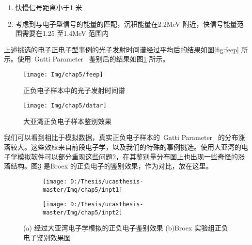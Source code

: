 \begin{enumerate}
\item 快慢信号距离小于1 米
\item 考虑到与电子型信号的能量的匹配，沉积能量在2.2MeV 附近，快信号能量范围需要在1.25 至1.4MeV 范围内
\end{enumerate}
上述挑选的电子正电子型事例的光子发射时间谱经过平均后的结果如图\ref{fig:feep} 所示。使用~Gatti Parameter~ 鉴别后的结果如图\ref{fig:datar} 所示。
\begin{figure}[!htbp]
\begin{minipage}[t]{0.48\linewidth}
    \centering
    \texttt{[image: Img/chap5/feep]}
    \caption{正负电子样本中的光子发射时间谱}
    \label{fig:feep}
\end{minipage}
\quad\quad
\begin{minipage}[t]{0.48\linewidth}
    \centering
    \texttt{[image: Img/chap5/datar]}
    \caption{大亚湾正负电子样本鉴别效果}
    \label{fig:datar}
\end{minipage}
\end{figure}
我们可以看到相比于模拟数据，真实正负电子样本的~Gatti Parameter~ 的分布涨落较大。这些效应来自前段电子学，以及我们的特殊的事例挑选。使用大亚湾的电子学模拟软件可以部分重现这些问题\ref{fig:inpt_1}，在其鉴别量分布图上也出现一些奇怪的涨落结构。图\ref{fig:inpt_2} 是Broex 的正负电子的鉴别效果，作为对比，放在这里。
\begin{figure}[!htbp]
  \centering
  \begin{subfigure}[b]{\MySubFactor\textwidth}
    \texttt{[image: D:/Thesis/ucasthesis-master/Img/chap5/inpt1]}
    \caption{}
    \label{fig:inpt_1}
  \end{subfigure}%
  \quad\quad\quad\quad\quad\quad%
  \begin{subfigure}[b]{\MySubFactor\textwidth}
    \texttt{[image: D:/Thesis/ucasthesis-master/Img/chap5/inpt2]}
    \caption{}
    \label{fig:inpt_2}
  \end{subfigure}
  \caption{(a) 经过大亚湾电子学模拟的正负电子鉴别效果 (b)Broex 实验组正负电子鉴别效果图}
  \label{fig:inpt}
\end{figure}
